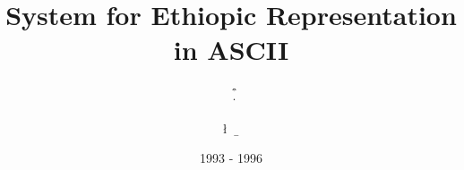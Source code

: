 \documentclass[a4paper]{report}
\begin{document}
\title{System for Ethiopic Representation in ASCII} 

\author{ \y\T\na \ \be\ni\ya\m \ \f\r\d\y\we\q  \\ 
         \I\na \\ \da\n\E\l \ \ya\II\qo\b \ \me\kWe\n\n}

\date{1993 - 1996}





\newpage   

\end{document}
